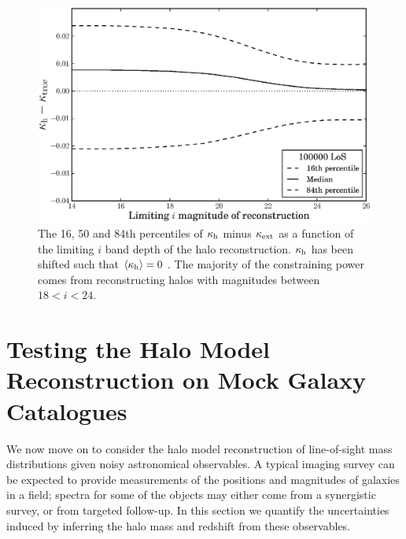 \documentclass[useAMS,usenatbib,a4paper]{mn2e}
\begin{document}
\begin{figure}
\includegraphics[width=\columnwidth]{figs/mag_scatter.eps}
\caption[magcut]{The 16, 50 and 84th percentiles of $\kappa_{\rm h}$ minus
$\kappa_{\rm ext}$ as a function of the limiting $i$ band depth of the halo
reconstruction. $\kappa_{\rm h}$ has been shifted such that
$\left\langle\kappa_{\rm h}\right\rangle=0$ . The majority of the constraining power
comes from reconstructing halos with magnitudes between $18<i<24$.}
\label{fig:magcut}
\end{figure}



\section{Testing the Halo Model Reconstruction on Mock Galaxy Catalogues}
\label{sec:obsMstar+z}

We now move on to consider the halo model reconstruction of line-of-sight mass
distributions given noisy astronomical observables. A typical imaging survey
can be expected to provide measurements of the positions and magnitudes of
galaxies in a field;  spectra for some of the objects may either come from a
synergistic survey, or from targeted follow-up. In this section we quantify
the uncertainties induced by inferring the halo mass and redshift from these
observables. 

\end{document}
